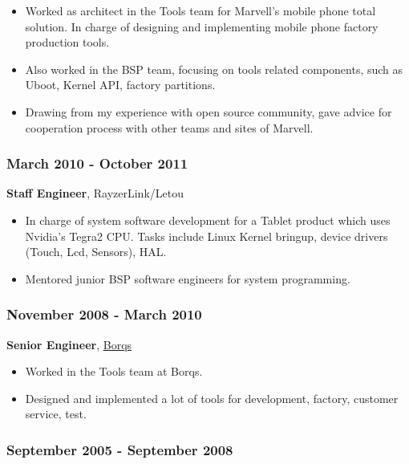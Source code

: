 \documentclass[11pt,dvipdfmx,CJKbookmarks]{article}
\begin{document}
\begin{CJK*}{UTF8}{simsun}
\begin{itemize}
\item Worked as architect in the Tools team for Marvell's mobile phone
total solution. In charge of designing and implementing mobile
phone factory production tools.

\item Also worked in the BSP team, focusing on tools related
components, such as Uboot, Kernel API, factory partitions.
\end{itemize}


\begin{itemize}
\item Drawing from my experience with open source community, gave
advice for cooperation process with other teams and sites of
Marvell.
\end{itemize}


\subsubsection{March 2010 - October 2011}
\label{sec-1-0-4}

\textbf{Staff Engineer}, RayzerLink/Letou

\begin{itemize}
\item In charge of system software development for a Tablet product
which uses Nvidia's Tegra2 CPU. Tasks include Linux Kernel
bringup, device drivers (Touch, Lcd, Sensors), HAL.

\item Mentored junior BSP software engineers for system programming.
\end{itemize}

\subsubsection{November 2008 - March 2010}
\label{sec-1-0-5}

\textbf{Senior Engineer}, \href{http://www.borqs.com}{Borqs}

\begin{itemize}
\item Worked in the Tools team at Borqs.

\item Designed and implemented a lot of tools for development,
factory, customer service, test.
\end{itemize}

\subsubsection{September 2005 - September 2008}
\label{sec-1-0-6}


\end{CJK*}
\end{document}
